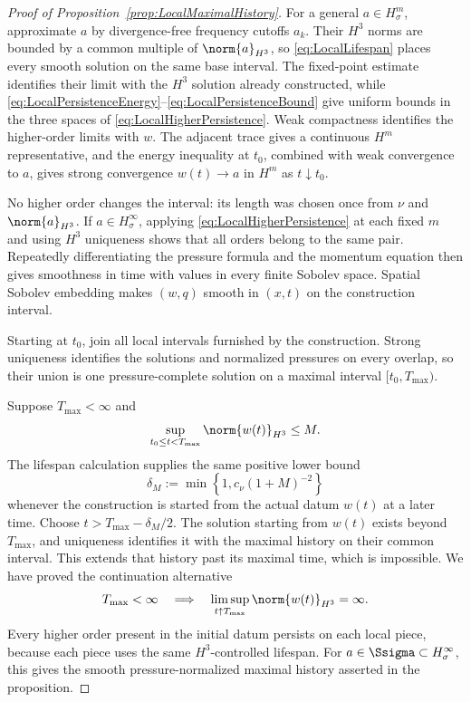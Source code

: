 \begin{proof}[Proof of Proposition~\ref{prop:LocalMaximalHistory}]
For a general \(a\in H^m_\sigma\), approximate \(a\) by divergence-free
frequency cutoffs \(a_k\). Their \(H^3\) norms are bounded by a common
multiple of \(\norm{a}_{H^3}\), so \eqref{eq:LocalLifespan} places every
smooth solution on the same base interval. The fixed-point estimate identifies
their limit with the \(H^3\) solution already constructed, while
\eqref{eq:LocalPersistenceEnergy}--\eqref{eq:LocalPersistenceBound} give
uniform bounds in the three spaces of \eqref{eq:LocalHigherPersistence}.
Weak compactness identifies the higher-order limits with \(w\). The adjacent
trace gives a continuous \(H^m\) representative, and the energy inequality at
\(t_0\), combined with weak convergence to \(a\), gives strong convergence
\(w(t)\to a\) in \(H^m\) as \(t\downarrow t_0\).

No higher order changes the interval: its length was chosen once from \(\nu\)
and \(\norm{a}_{H^3}\). If \(a\in H^\infty_\sigma\), applying
\eqref{eq:LocalHigherPersistence} at each fixed \(m\) and using \(H^3\)
uniqueness shows that all orders belong to the same pair. Repeatedly
differentiating the pressure formula and the momentum equation then gives
smoothness in time with values in every finite Sobolev space. Spatial Sobolev
embedding makes \((w,q)\) smooth in \((x,t)\) on the construction interval.


Starting at \(t_0\), join all local intervals furnished by the construction.
Strong uniqueness identifies the solutions and normalized pressures on every
overlap, so their union is one pressure-complete solution on a maximal interval
\([t_0,T_{\max})\).

Suppose \(T_{\max}<\infty\) and
\[
  \sup_{t_0\leq t<T_{\max}}\norm{w(t)}_{H^3}\leq M.
\]
The lifespan calculation supplies the same positive lower bound
\[
  \delta_M
  :=\min\left\{1,c_\nu(1+M)^{-2}\right\}
\]
whenever the construction is started from the actual datum \(w(t)\) at a later
time. Choose \(t>T_{\max}-\delta_M/2\). The solution starting from \(w(t)\)
exists beyond \(T_{\max}\), and uniqueness identifies it with the maximal
history on their common interval. This extends that history past its maximal
time, which is impossible. We have proved the continuation alternative
\begin{equation}
  T_{\max}<\infty
  \quad\Longrightarrow\quad
  \limsup_{t\uparrow T_{\max}}\norm{w(t)}_{H^3}=\infty.
  \label{eq:LocalContinuationAlternative}
\end{equation}
Every higher order present in the initial datum persists on each local piece,
because each piece uses the same \(H^3\)-controlled lifespan. For
\(a\in\Ssigma\subset H^\infty_\sigma\), this gives the smooth
pressure-normalized maximal history asserted in the proposition.
\end{proof}

